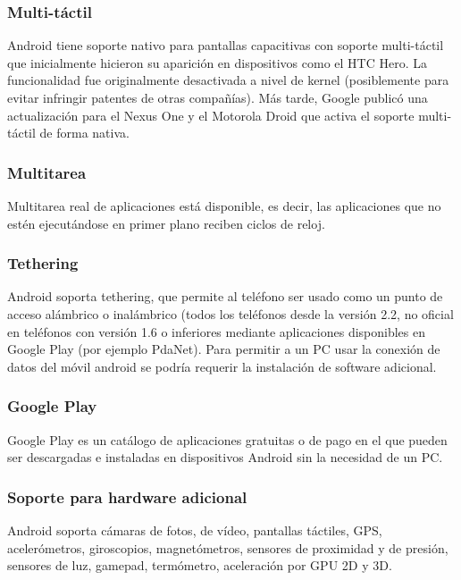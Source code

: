\documentclass{bmcart}
\begin{document}
\subsubsection*{Multi-táctil}

Android tiene soporte nativo para pantallas capacitivas con soporte multi-táctil que inicialmente hicieron su aparición en dispositivos como el HTC Hero. La funcionalidad fue originalmente desactivada a nivel de kernel (posiblemente para evitar infringir patentes de otras compañías). Más tarde, Google publicó una actualización para el Nexus One y el Motorola Droid que activa el soporte multi-táctil de forma nativa.

\subsubsection*{Multitarea}
Multitarea real de aplicaciones está disponible, es decir, las aplicaciones que no estén ejecutándose en primer plano reciben ciclos de reloj.

\subsubsection*{Tethering}

Android soporta tethering, que permite al teléfono ser usado como un punto de acceso alámbrico o inalámbrico (todos los teléfonos desde la versión 2.2, no oficial en teléfonos con versión 1.6 o inferiores mediante aplicaciones disponibles en Google Play (por ejemplo PdaNet). Para permitir a un PC usar la conexión de datos del móvil android se podría requerir la instalación de software adicional.

\subsubsection*{Google Play}

Google Play es un catálogo de aplicaciones gratuitas o de pago en el que pueden ser descargadas e instaladas en dispositivos Android sin la necesidad de un PC.

\subsubsection*{Soporte para hardware adicional}

Android soporta cámaras de fotos, de vídeo, pantallas táctiles, GPS, acelerómetros, giroscopios, magnetómetros, sensores de proximidad y de presión, sensores de luz, gamepad, termómetro, aceleración por GPU 2D y 3D.
\end{document}
